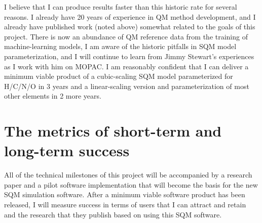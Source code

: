 \documentclass[12pt]{article}
\begin{document}
I believe that I can produce results faster than this historic rate for several reasons.
I already have 20 years of experience in QM method development, and I already have published work (noted above) somewhat related to the goals of this project.
There is now an abundance of QM reference data from the training of machine-learning models, I am aware of the historic pitfalls in SQM model parameterization,
 and I will continue to learn from Jimmy Stewart's experiences as I work with him on MOPAC.
I am reasonably confident that I can deliver a minimum viable product of a cubic-scaling SQM model parameterized for H/C/N/O in 3 years
 and a linear-scaling version and parameterization of most other elements in 2 more years.

\section{The metrics of short-term and long-term success}

All of the technical milestones of this project will be accompanied by a research paper and a pilot software implementation
 that will become the basis for the new SQM simulation software.
After a minimum viable software product has been released, I will measure success in terms of users that I can attract and retain
 and the research that they publish based on using this SQM software.
\end{document}
